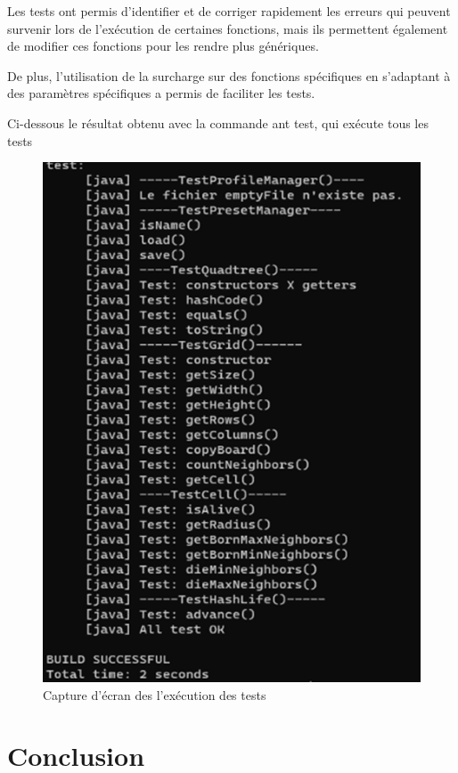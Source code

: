 \documentclass[12pt]{article}
\begin{document}
			Les tests ont permis d'identifier et de corriger rapidement les erreurs qui peuvent survenir lors de l'exécution de certaines fonctions, mais ils permettent également de modifier ces fonctions pour les rendre plus génériques.
			
			De plus, l'utilisation de la surcharge sur des fonctions spécifiques en s'adaptant à des paramètres spécifiques a permis de faciliter les tests.
			
			Ci-dessous le résultat obtenu avec la commande ant test, qui exécute tous les tests
			\begin{figure}[!ht]
				\centering
				\includegraphics{images/tests.png}
				\caption{Capture d'écran des l'exécution des tests}
			\end{figure}
		
			\section{Conclusion}
\end{document}
